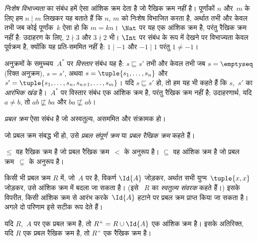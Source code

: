 \documentclass[../../../include/open-logic-section]{subfiles}
\begin{document}
\begin{ex}
\emph{निःशेष विभाज्यता} का संबंध हमें ऐसा आंशिक क्रम देता है जो रैखिक क्रम
नहीं है। पूर्णांकों $n$ और~$m$ के लिए हम $n \mid m$ लिखकर यह बताते हैं कि
$n$, $m$ को निःशेष विभाजित करता है, अर्थात तभी और केवल तभी जब कोई
पूर्णांक~$k$ ऐसा हो कि $m = kn$।~$\Nat$ पर यह एक आंशिक क्रम है, परंतु रैखिक
क्रम नहीं है: उदाहरण के लिए, $2 \nmid 3$ और $3 \nmid
2$ भी। $\Int$ पर संबंध के रूप में देखने पर विभाज्यता केवल पूर्वक्रम है,
क्योंकि यह प्रति-सममित नहीं है: $1 \mid -1$ और $-1 \mid 1$
परंतु $1 \neq -1$।
\end{ex}

\begin{ex}
अनुक्रमों के समुच्चय~$A^*$ पर \emph{विस्तार} संबंध यह है: $s \sqsubseteq s'$
तभी और केवल तभी जब $s = \emptyseq$ (रिक्त
अनुक्रम), $s = s'$, अथवा $s = \tuple{s_1, \dots, s_n}$ और $s' =
\tuple{s_1, \dots, s_n, s_{n+1}, \dots, s_m}$। यदि $s \sqsubseteq s'$ हो,
तो हम यह भी कहते हैं कि $s$,~$s'$ का \emph{आरंभिक खंड} है।~$A^*$ पर
विस्तार संबंध एक आंशिक क्रम है, परंतु रैखिक क्रम नहीं है; उदाहरणार्थ, यदि
$a \neq b$, तो $ab \not\sqsubseteq ba$ और $ba \not\sqsubseteq ab$।
\end{ex}

\begin{defn}[प्रबल क्रम]
\emph{प्रबल क्रम} ऐसा संबंध है जो अस्वतुल्य, असममित और संक्रामक हो।
\end{defn}

\begin{defn}[प्रबल रैखिक क्रम]
जो प्रबल क्रम संबद्ध भी हो, उसे 
\emph{प्रबल संपूर्ण क्रम} या \emph{प्रबल रैखिक क्रम} कहते हैं।
\end{defn}

\begin{ex}
$\le$ वह रैखिक क्रम है जो प्रबल रैखिक क्रम~$<$ के अनुरूप है। $\subseteq$
वह आंशिक क्रम है जो प्रबल क्रम~$\subsetneq$ के अनुरूप है।
\end{ex}

किसी भी प्रबल क्रम $R$ में, जो~$A$ पर है, विकर्ण $\Id{A}$ जोड़कर, अर्थात
सभी युग्म~$\tuple{x,
x}$ जोड़कर, उसे आंशिक क्रम में बदला जा सकता है। (इसे
~$R$ का \emph{स्वतुल्य संवरक} कहते हैं।) इसके विपरीत, किसी आंशिक क्रम से
आरंभ करके~$\Id{A}$ हटाने पर प्रबल क्रम प्राप्त किया जा सकता है। अगले दो
परिणाम इसे सटीक रूप देते हैं।

\begin{prop}
यदि $R$,~$A$ पर एक प्रबल क्रम है, तो $R^+ = R \cup \Id{A}$ एक आंशिक क्रम
है। इसके अतिरिक्त, यदि $R$ एक प्रबल रैखिक क्रम है, तो $R^+$ एक रैखिक क्रम
है।
\end{prop}
\end{document}
